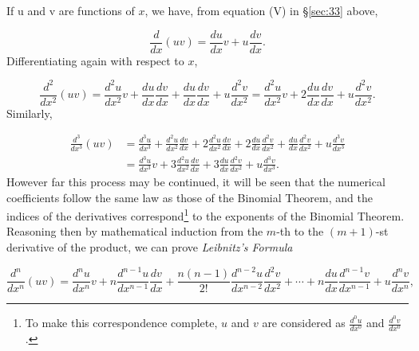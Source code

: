 If u and v are functions of $x$, we have, from 
equation (V) in \S \ref{sec:33}  above, %

\[
    \frac{d}{dx} (uv) = \frac{du}{dx} v + u \frac{dv}{dx}.
\]
Differentiating again with respect to $x$,

\[
\frac{d^2}{dx^2}(uv) 
= \frac{d^2u}{dx^2}v + \frac{du}{dx} \frac{dv}{dx} 
+ \frac{du}{dx} \frac{dv}{dx} + u \frac{d^2 v}{dx^2} 
= \frac{d^2 u}{dx^2}v + 2 \frac{du}{dx} \frac{dv}{dx} 
+ u \frac{d^2 v}{dx^2}.
\]
Similarly,

\[
\begin{array}{ll}
\frac{d^3}{dx^3}(uv) 	
&= \frac{d^3 u}{dx^3} + \frac{d^2 u}{dx^2} \frac{dv}{dx} 
+ 2\frac{d^2 u}{dx^2} \frac{dv}{dx} + 2 \frac{du}{dx} \frac{d^2 v}{dx^2} 
+ \frac{du}{dx} \frac{d^2 v}{dx^2} + u \frac{d^3 v}{dx^3}\\
&= \frac{d^3 u}{dx^3}v + 3\frac{d^2 u}{dx^2} \frac{dv}{dx} 
+ 3 \frac{du}{dx} \frac{d^2 v}{dx^2} + u \frac{d^3 v}{dx^3}.
\end{array}
\]
However far this process may be continued, it will be seen 
that the numerical coefficients follow the same law as 
those of the Binomial Theorem, and the indices of 
the derivatives correspond\footnote{To make this 
correspondence complete, $u$ and $v$ are considered as 
$\frac{d^0 u}{dx^0}$ and $\frac{d^0 v}{dx^0}$.} 
to the exponents of the Binomial Theorem.
Reasoning then by mathematical induction from the 
$m$-th to the $(m + 1 )$-st derivative of the product, 
we can prove {\it Leibnitz's Formula}

\begin{equation}
\frac{d^n}{dx^n}(uv) 
= \frac{d^n u}{dx^n} v + n \frac{d^{n - 1} u}{dx^{n - 1}} \frac{dv}{dx} 
+ \frac{n (n - 1)}{2!} \frac{d^{n - 2} u}{dx^{n - 2}} \frac{d^2 v}{dx^2} 
+ \cdots + n \frac{du}{dx} \frac{d^{n - 1} v}{dx^{n - 1}} 
+ u \frac{d^nv}{dx^n},
\label{eqn:17-77}
\end{equation}


